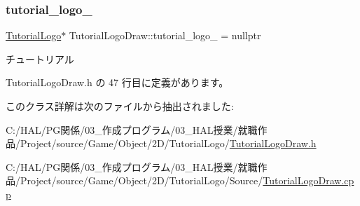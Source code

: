 \mbox{\label{class_tutorial_logo_draw_ab357c25048d3582466a24234896adf3f}} 
\subsubsection{\texorpdfstring{tutorial\+\_\+logo\+\_\+}{tutorial\_logo\_}}
{\footnotesize\ttfamily \mbox{\hyperlink{class_tutorial_logo}{Tutorial\+Logo}}$\ast$ Tutorial\+Logo\+Draw\+::tutorial\+\_\+logo\+\_\+ = nullptr\hspace{0.3cm}{\ttfamily [private]}}



チュートリアル 



 Tutorial\+Logo\+Draw.\+h の 47 行目に定義があります。



このクラス詳解は次のファイルから抽出されました\+:\begin{DoxyCompactItemize}
\item 
C\+:/\+H\+A\+L/\+P\+G関係/03\+\_\+作成プログラム/03\+\_\+\+H\+A\+L授業/就職作品/\+Project/source/\+Game/\+Object/2\+D/\+Tutorial\+Logo/\mbox{\hyperlink{_tutorial_logo_draw_8h}{Tutorial\+Logo\+Draw.\+h}}\item 
C\+:/\+H\+A\+L/\+P\+G関係/03\+\_\+作成プログラム/03\+\_\+\+H\+A\+L授業/就職作品/\+Project/source/\+Game/\+Object/2\+D/\+Tutorial\+Logo/\+Source/\mbox{\hyperlink{_tutorial_logo_draw_8cpp}{Tutorial\+Logo\+Draw.\+cpp}}\end{DoxyCompactItemize}
